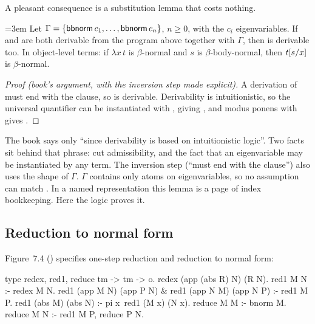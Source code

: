 {{A pleasant consequence is a substitution lemma that costs nothing.

\begin{theorem}\label{thm:lambdatree-bnorm-subst}\emergencystretch=3em
Let $\Gamma=\{\mathsf{bbnorm}\,c_1,\allowbreak\ldots,\allowbreak\mathsf{bbnorm}\,c_n\}$, $n\ge0$, with the $c_i$ eigenvariables. If
 and  are both derivable from the program above together with $\Gamma$, then
 is derivable too. In object-level terms: if $\lambda x\,t$ is $\beta$-normal and $s$ is
$\beta$-body-normal, then $t[s/x]$ is $\beta$-normal.
\end{theorem}
\begin{proof}[Proof (book's argument, with the inversion step made explicit)]
A derivation of  must end with the  clause, so
 is derivable. Derivability is intuitionistic, so the universal quantifier
can be instantiated with , giving , and modus ponens with 
gives .
\end{proof}
The book says only \enquote{since derivability is based on intuitionistic logic}. Two facts sit behind that
phrase: cut admissibility, and the fact that an eigenvariable may be instantiated by any term. The inversion
step (\enquote{must end with the  clause}) also uses the shape of $\Gamma$. $\Gamma$ contains only
atoms  on eigenvariables, so no assumption can match . In a named
representation this lemma is a page of index bookkeeping. Here the logic proves it.

\subsection{Reduction to normal form}\label{sec:lambdatree-reduce}

Figure~7.4 () specifies one-step reduction and reduction to normal form:
\begin{lprolog}
type redex, red1, reduce  tm -> tm -> o.
redex (app (abs R) N) (R N).
red1 M N :- redex M N.
red1 (app M N) (app P N) & red1 (app N M) (app N P) :- red1 M P.
red1 (abs M) (abs N) :- pi x\ red1 (M x) (N x).
reduce M M :- bnorm M.
reduce M N :- red1 M P, reduce P N.


\end{lprolog}}}
